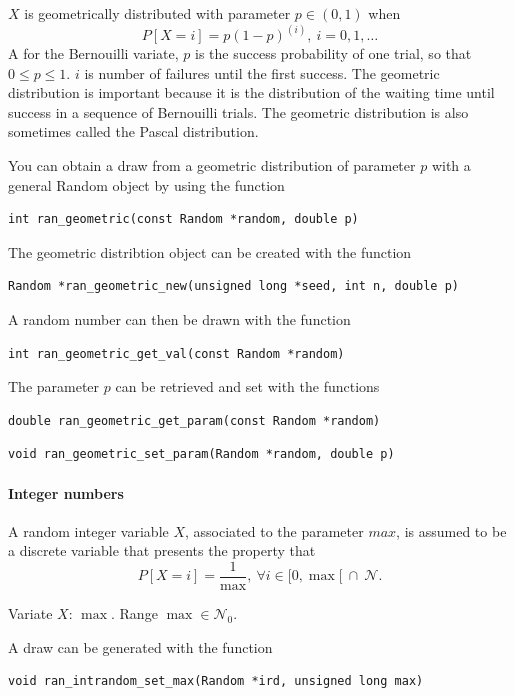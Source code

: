 $X$ is geometrically distributed with parameter $p \in (0,1)$ when
\[
P[X = i] = p(1-p)^{(i)}, \ i = 0,1,\ldots
\]
A for the Bernouilli variate, $p$ is the success probability of one
trial, so that $0 \leq p \leq 1$.
$i$ is number of failures until the first success.
The geometric distribution is important because it is the distribution
of the waiting time until success in a sequence of Bernouilli
trials. The geometric distribution is also sometimes called the Pascal
distribution.

You can obtain a draw from a geometric distribution of parameter
$p$ with a general Random object by using the function
\begin{verbatim}
int ran_geometric(const Random *random, double p)
\end{verbatim}
The geometric distribtion object can be created with the function
\begin{verbatim}
Random *ran_geometric_new(unsigned long *seed, int n, double p)
\end{verbatim}
A random number can then be drawn with the function
\begin{verbatim}
int ran_geometric_get_val(const Random *random)
\end{verbatim}
The parameter $p$ can be retrieved and set with the functions
\begin{verbatim}
double ran_geometric_get_param(const Random *random)
\end{verbatim}
\begin{verbatim}
void ran_geometric_set_param(Random *random, double p)
\end{verbatim}


\paragraph{Integer numbers}

A random integer variable $X$, associated to the parameter $max$, is
assumed to be a discrete variable that presents the property that
\[
P[X = i] = \frac{1}{\max},\ \forall i \in [0, \max[ \ \cap\ \mathcal{N}.
\]
\begin{center}
Variate $X$: $\max$.
Range $\max \in \mathcal{N}_0.$
\end{center}

A draw can be generated with the function
\begin{verbatim}
void ran_intrandom_set_max(Random *ird, unsigned long max)
\end{verbatim}


